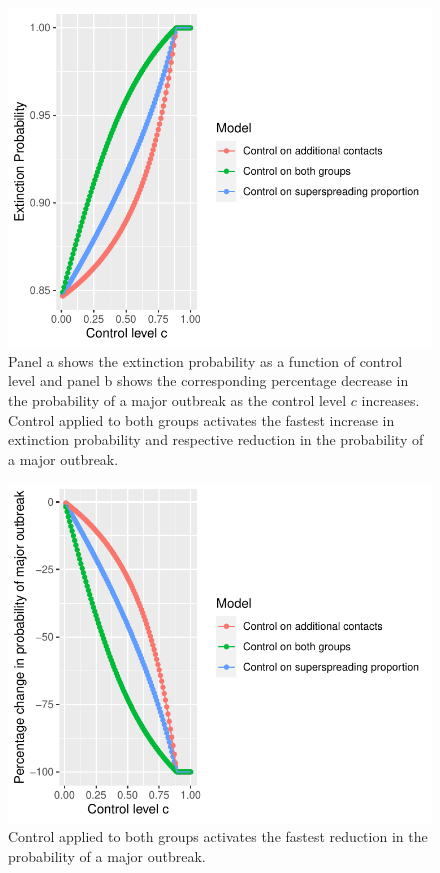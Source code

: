 \documentclass{imammb}
\numberwithin{equation}{section}
\begin{document}
\begin{figure}
    \centering
    \includegraphics{Figure8.pdf}
    \caption{Panel a shows the extinction probability as a function of control level and panel b shows the corresponding percentage decrease in the probability of a major outbreak as the control level $c$ increases. Control applied to both groups activates the fastest increase in extinction probability and respective reduction in the probability of a major outbreak.  }
    \label{fig:extprob}
\end{figure}

\begin{figure}
    \centering
    \includegraphics{Figure10.pdf}
    \caption{Control applied to both groups activates the fastest reduction in the probability of a major outbreak.}
    \label{fig:percentchange}
\end{figure}
\end{document}
